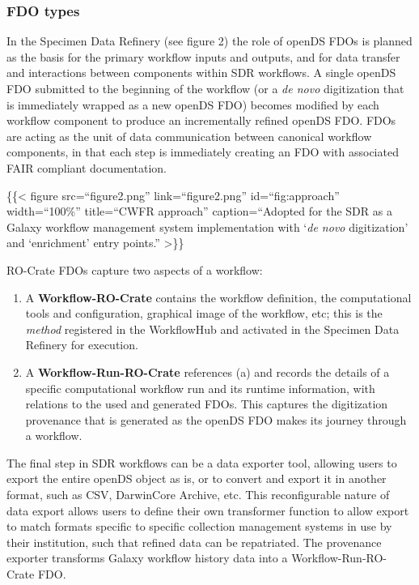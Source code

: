 \hypertarget{fdo-types}{%
\subsubsection{FDO types}\label{fdo-types}}

In the Specimen Data Refinery (see figure 2) the role of openDS FDOs is
planned as the basis for the primary workflow inputs and outputs, and
for data transfer and interactions between components within SDR
workflows. A single openDS FDO submitted to the beginning of the
workflow (or a \emph{de novo} digitization that is immediately wrapped
as a new openDS FDO) becomes modified by each workflow component to
produce an incrementally refined openDS FDO. FDOs are acting as the unit
of data communication between canonical workflow components, in that
each step is immediately creating an FDO with associated FAIR compliant
documentation.

\{\{\textless{} figure src=``figure2.png'' link=``figure2.png''
id=``fig:approach'' width=``100\%'' title=``CWFR approach''
caption=``Adopted for the SDR as a Galaxy workflow management system
implementation with `\emph{de novo} digitization' and `enrichment' entry
points.'' \textgreater\}\}

RO-Crate FDOs capture two aspects of a workflow:

\begin{enumerate}
\def\labelenumi{\alph{enumi})}
\item
  A \textbf{Workflow-RO-Crate} contains the workflow definition, the
  computational tools and configuration, graphical image of the
  workflow, etc; this is the \emph{method} registered in the WorkflowHub
  and activated in the Specimen Data Refinery for execution.
\item
  A \textbf{Workflow-Run-RO-Crate} references (a) and records the
  details of a specific computational workflow run and its runtime
  information, with relations to the used and generated FDOs. This
  captures the digitization provenance that is generated as the openDS
  FDO makes its journey through a workflow.
\end{enumerate}

The final step in SDR workflows can be a data exporter tool, allowing
users to export the entire openDS object as is, or to convert and export
it in another format, such as CSV, DarwinCore Archive, etc. This
reconfigurable nature of data export allows users to define their own
transformer function to allow export to match formats specific to
specific collection management systems in use by their institution, such
that refined data can be repatriated. The provenance exporter transforms
Galaxy workflow history data into a Workflow-Run-RO-Crate FDO.


